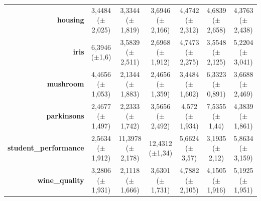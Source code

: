 \documentclass[preprint,review,12pt]{elsarticle}
\begin{document}
\begin{table}[!tb]
{\begin{tabular}{r|ccc|c|c|c|}
			\textbf{housing}              & \cellcolor[rgb]{ .404,  .749,  .482}3,4484 ($\pm$2,025)                            & \cellcolor[rgb]{ .388,  .745,  .482}3,3344 ($\pm$1,819) & \cellcolor[rgb]{ .439,  .757,  .482}3,6946 ($\pm$2,166) & \cellcolor[rgb]{ .553,  .792,  .49}4,4742 ($\pm$2,312)  & \cellcolor[rgb]{ .584,  .8,  .49}4,6839 ($\pm$2,658)    & \cellcolor[rgb]{ .537,  .788,  .49}4,3763 ($\pm$2,438)  \\
			\textbf{iris}                 & \cellcolor[rgb]{ .965,  .91,  .514}6,3946 ($\pm$1,6)                               & \cellcolor[rgb]{ .525,  .784,  .49}3,5839 ($\pm$2,511)  & \cellcolor[rgb]{ .388,  .745,  .482}2,6968 ($\pm$1,912) & \cellcolor[rgb]{ .706,  .835,  .498}4,7473 ($\pm$2,275) & \cellcolor[rgb]{ .522,  .78,  .486}3,5548 ($\pm$2,125)  & \cellcolor[rgb]{ .78,  .859,  .502}5,2204 ($\pm$3,041)  \\
			\textbf{mushroom}             & \cellcolor[rgb]{ .71,  .835,  .498}4,4656 ($\pm$1,053)                             & \cellcolor[rgb]{ .388,  .745,  .482}2,1344 ($\pm$1,883) & \cellcolor[rgb]{ .431,  .757,  .482}2,4656 ($\pm$1,359) & \cellcolor[rgb]{ .569,  .796,  .49}3,4484 ($\pm$1,602)  & \cellcolor[rgb]{ .969,  .91,  .514}6,3323 ($\pm$0,891)  & \cellcolor[rgb]{ .6,  .804,  .494}3,6688 ($\pm$2,469)   \\
			\textbf{parkinsons}           & \cellcolor[rgb]{ .412,  .749,  .482}2,4677 ($\pm$1,497)                            & \cellcolor[rgb]{ .388,  .745,  .482}2,2333 ($\pm$1,742) & \cellcolor[rgb]{ .541,  .788,  .49}3,5656 ($\pm$2,492)  & \cellcolor[rgb]{ .655,  .82,  .494}4,572 ($\pm$1,934)   & \cellcolor[rgb]{ 1,  .922,  .518}7,5355 ($\pm$1,44)     & \cellcolor[rgb]{ .635,  .816,  .494}4,3839 ($\pm$1,861) \\
			\textbf{student\_performance} & \cellcolor[rgb]{ .388,  .745,  .482}2,5634 ($\pm$1,912)                            & \cellcolor[rgb]{ .98,  .506,  .439}11,3978 ($\pm$2,178) & \cellcolor[rgb]{ .973,  .412,  .42}12,4312 ($\pm$1,34)  & \cellcolor[rgb]{ .843,  .875,  .506}5,6624 ($\pm$3,57)  & \cellcolor[rgb]{ .478,  .769,  .486}3,1935 ($\pm$2,12)  & \cellcolor[rgb]{ .875,  .882,  .51}5,8634 ($\pm$3,159)  \\
			\textbf{wine\_quality}        & \cellcolor[rgb]{ .569,  .796,  .49}3,2806 ($\pm$1,931)                             & \cellcolor[rgb]{ .388,  .745,  .482}2,1118 ($\pm$1,666) & \cellcolor[rgb]{ .624,  .812,  .494}3,6301 ($\pm$1,731) & \cellcolor[rgb]{ .808,  .863,  .506}4,7882 ($\pm$2,105) & \cellcolor[rgb]{ .706,  .835,  .498}4,1505 ($\pm$1,916) & \cellcolor[rgb]{ .871,  .882,  .51}5,1925 ($\pm$1,951)  \\

\end{tabular}}
\end{table}
\end{document}
